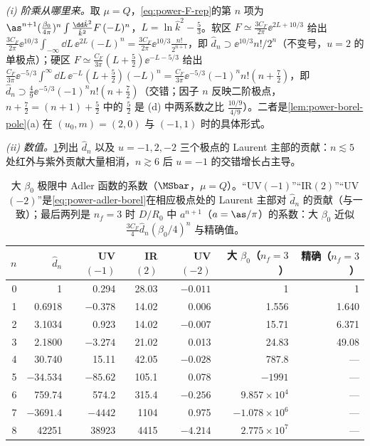 \begin{example}[带 $n$ 个费米子泡的单胶子]\label{ex:power-renormalon-chain}
\emph{(i) 阶乘从哪里来。}取 $\mu=Q$，\eqref{eq:power-F-rep}的第 $n$ 项为 $\as^{n+1}(\frac{\beta_0}{4\pi})^n\int\frac{\dd\hat k^2}{\hat k^2}F\,(-L)^n$，$L=\ln\hat k^2-\frac53$。软区 $F\simeq\frac{3C_F}{2\pi}\ee^{2L+10/3}$ 给出 $\frac{3C_F}{2\pi}\ee^{10/3}\int_{-\infty}\dd L\,\ee^{2L}(-L)^n=\frac{3C_F}{2\pi}\ee^{10/3}\frac{n!}{2^{n+1}}$，即 $\hat d_n\supset\ee^{10/3}n!/2^n$（不变号，$u=2$ 的单极点）；硬区 $F\simeq\frac{C_F}{3\pi}(L+\frac52)\ee^{-L-5/3}$ 给出 $\frac{C_F}{3\pi}\ee^{-5/3}\int^\infty\dd L\,\ee^{-L}(L+\frac52)(-L)^n=\frac{C_F}{3\pi}\ee^{-5/3}(-1)^nn!(n+\frac72)$，即 $\hat d_n\supset\frac49\ee^{-5/3}(-1)^nn!(n+\frac72)$（交错；因子 $n$ 反映二阶极点，$n+\frac72=(n+1)+\frac52$ 中的 $\frac52$ 是 (d) 中两系数之比 $\frac{10/9}{4/9}$）。二者是\cref{lem:power-borel-pole}(a) 在 $(u_0,m)=(2,0)$ 与 $(-1,1)$ 时的具体形式。

\emph{(ii) 数值。}\cref{tab:power-adler-coeffs}列出 $\hat d_n$ 以及 $u=-1,2,-2$ 三个极点的 Laurent 主部的贡献：$n\lesssim5$ 处红外与紫外贡献大量相消，$n\gtrsim6$ 后 $u=-1$ 的交错增长占主导。

\begin{table}[htbp]
\centering\small
\caption{大 $\beta_0$ 极限中 Adler 函数的系数（$\MSbar$，$\mu=Q$）。“UV$(-1)$”“IR$(2)$”“UV$(-2)$”是\eqref{eq:power-adler-borel}在相应极点处的 Laurent 主部对 $\hat d_n$ 的贡献（与\cite[表~5]{Beneke1999}一致）；最后两列是 $n_f=3$ 时 $D/R_0$ 中 $a^{n+1}$（$a=\as/\pi$）的系数：大 $\beta_0$ 近似 $\frac{3C_F}{4}\hat d_n(\beta_0/4)^n$ 与精确值。}
\label{tab:power-adler-coeffs}
\begin{tabular}{@{}rrrrrrr@{}}
\toprule
$n$ & $\hat d_n$ & UV$(-1)$ & IR$(2)$ & UV$(-2)$ & 大 $\beta_0$（$n_f=3$） & 精确（$n_f=3$）\\
\midrule
0 & 1 & 0.294 & 28.03 & $-0.011$ & 1 & 1 \\
1 & 0.6918 & $-0.378$ & 14.02 & 0.006 & 1.556 & 1.640 \\
2 & 3.1034 & 0.923 & 14.02 & $-0.007$ & 15.71 & 6.371 \\
3 & 2.1800 & $-3.274$ & 21.02 & 0.013 & 24.83 & 49.08 \\
4 & 30.740 & 15.11 & 42.05 & $-0.028$ & 787.8 & --- \\
5 & $-34.534$ & $-85.62$ & 105.1 & 0.078 & $-1991$ & --- \\
6 & 759.74 & 574.2 & 315.4 & $-0.256$ & $9.857\times10^4$ & --- \\
7 & $-3691.4$ & $-4442$ & 1104 & 0.975 & $-1.078\times10^6$ & --- \\
8 & 42251 & 38923 & 4415 & $-4.214$ & $2.775\times10^7$ & --- \\
\bottomrule
\end{tabular}
\end{table}


\end{example}

